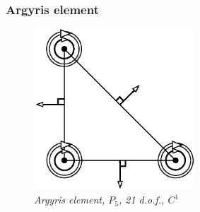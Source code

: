 \documentclass[11pt,a4paper]{article}
\begin{document}
\subsubsection{Argyris element}

\begin{figure}[H]
  \begin{center}
    \includegraphics[width=6cm,angle=0]{getfemlist_argyris.eps}
  \end{center}
  \caption{ \it Argyris element, $P_5$, 21 d.o.f., $C^1$}
  \label{fig:argyris}
\end{figure}
\end{document}

